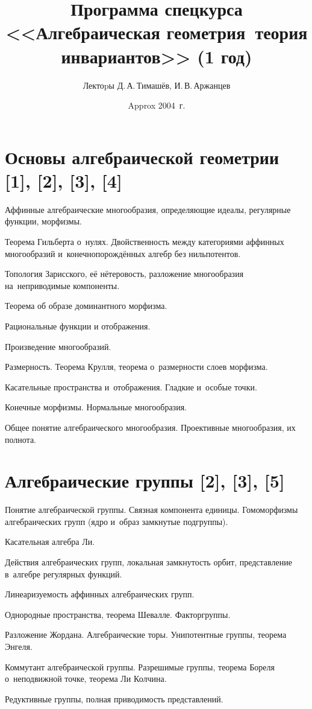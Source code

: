 \documentclass[a4paper]{article}
\title{Программа спецкурса <<Алгебраическая геометрия\ теория инвариантов>> (1 год)}
\author{Лектоpы Д.\,А.\,Тимашёв, И.\,В.\,Аржанцев}
\date{Approx 2004~г.}
\begin{document}
\maketitle

\section*{Основы алгебраической геометрии [1], [2], [3], [4]}
\begin{items}{-2}
\item Аффинные алгебраические многообразия, определяющие идеалы, регулярные функции, морфизмы.
\item Теорема Гильберта о~нулях. Двойственность между категориями аффинных многообразий и~конечнопорождённых алгебр без нильпотентов.
\item Топология Зарисского, её нётеровость, разложение многообразия на~неприводимые компоненты.
\item Теорема об образе доминантного морфизма.
\item Рациональные функции и отображения.
\item Произведение многообразий.
\item Размерность. Теорема Крулля, теорема о~размерности слоев морфизма.
\item Касательные пространства и~отображения. Гладкие и~особые точки.
\item Конечные морфизмы. Нормальные многообразия.
\item Общее понятие алгебраического многообразия. Проективные многообразия, их полнота.
\end{items}

\section*{Алгебраические группы [2], [3], [5]}
\begin{items}{-2}
\item Понятие алгебраической группы. Связная компонента единицы. Гомоморфизмы
алгебраических групп (ядро и~образ замкнутые подгруппы).
\item Касательная алгебра Ли.
\item Действия алгебраических групп, локальная замкнутость орбит, представление в~алгебре регулярных функций.
\item Линеаризуемость аффинных алгебраических групп.
\item Однородные пространства, теорема Шевалле. Факторгруппы.
\item Разложение Жордана. Алгебраические торы. Унипотентные группы, теорема Энгеля.
\item Коммутант алгебраической группы. Разрешимые группы, теорема Бореля о~неподвижной точке, теорема Ли Колчина.
\item Редуктивные группы, полная приводимость представлений.
\end{items}
\end{document}
